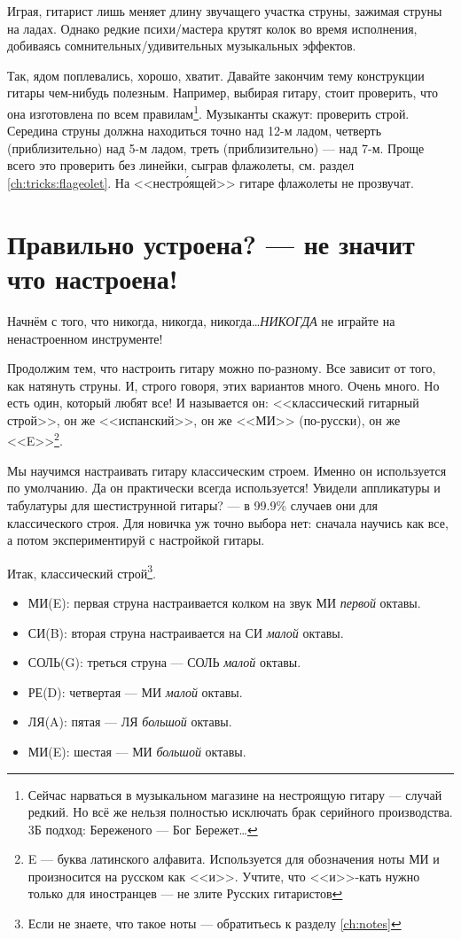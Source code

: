 Играя, гитарист лишь меняет длину звучащего участка струны, зажимая струны на ладах. Однако редкие психи/мастера крутят колок во время исполнения, добиваясь сомнительных/удивительных музыкальных эффектов.

Так, ядом поплевались, хорошо, хватит. Давайте закончим тему конструкции гитары чем-нибудь полезным. Например, выбирая гитару, стоит проверить, что она изготовлена по всем правилам\footnote{Сейчас нарваться в музыкальном магазине на нестроящую гитару --- случай редкий. Но всё же нельзя полностью исключать брак серийного производства. 3Б подход: Береженого --- Бог Бережет\ldots}. Музыканты скажут: проверить строй. Середина струны должна находиться точно над 12-м ладом, четверть (приблизительно) над 5-м ладом, треть (приблизительно) --- над 7-м. Проще всего это проверить без линейки, сыграв флажолеты, см. раздел \ref{ch:tricks:flageolet}. На <<нестр\'{о}ящей>> гитаре флажолеты не прозвучат.


\section{Правильно устроена? --- не значит что настроена!}
\label{ch:guitar:tuning}

Начнём с того, что никогда, никогда, никогда\ldots \emph{НИКОГДА} не играйте на ненастроенном инструменте!

Продолжим тем, что настроить гитару можно по-разному. Все зависит от того, как натянуть струны. И, строго говоря, этих вариантов много. Очень много. Но есть один, который любят все! И называется он: <<классический гитарный строй>>, он же <<испанский>>, он же <<МИ>> (по-русски), он же <<E>>\footnote{E --- буква латинского алфавита. Используется для обозначения ноты МИ и произносится на русском как <<и>>. Учтите, что <<и>>-кать нужно только для иностранцев --- не злите Русских гитаристов}. 

Мы научимся настраивать гитару классическим строем. Именно он используется по умолчанию. Да он практически всегда используется! Увидели аппликатуры и табулатуры для шестиструнной гитары? --- в 99.9\% случаев они для классического строя. Для новичка уж точно выбора нет: сначала научись как все, а потом экспериментируй с настройкой гитары.

Итак, классический строй\footnote{Если не знаете, что такое ноты --- обратитьесь к разделу \ref{ch:notes}}.
\begin{itemize}
    \item МИ(E): первая струна настраивается колком на звук МИ \emph{первой} октавы.
    \item СИ(B): вторая струна настраивается на СИ \emph{малой} октавы.
    \item СОЛЬ(G): треться струна --- СОЛЬ \emph{малой} октавы.
    \item РЕ(D): четвертая --- МИ \emph{малой} октавы.
    \item ЛЯ(A): пятая --- ЛЯ \emph{большой} октавы.
    \item МИ(E): шестая --- МИ \emph{большой} октавы.
\end{itemize}

